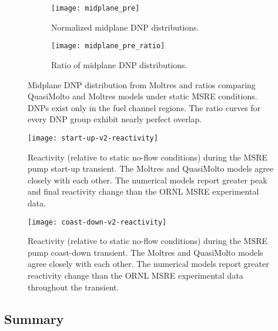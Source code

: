 \begin{figure}[htb]
  \centering
  \begin{subfigure}[b]{0.48\columnwidth}
    \centering
    \texttt{[image: midplane\_pre]}
    \caption{Normalized midplane \gls{DNP} distributions.}
    \label{fig:midplane-pre-dist}
  \end{subfigure}
  \hfill
  \begin{subfigure}[b]{0.48\columnwidth}
    \centering
    \texttt{[image: midplane\_pre\_ratio]}
    \caption{Ratio of midplane \gls{DNP} distributions.}
    \label{fig:midplane-pre-ratio}
  \end{subfigure}
  \caption{Midplane \gls{DNP} distribution from Moltres and ratios comparing QuasiMolto and Moltres
  models under static \gls{MSRE} conditions. \glspl{DNP} exist only in the fuel channel regions.
  The ratio curves for every \gls{DNP} group exhibit nearly perfect overlap.}
  \label{fig:midplane-pre}
\end{figure}

\begin{figure}[htb]
  \centering
  \texttt{[image: start-up-v2-reactivity]}
  \caption{Reactivity (relative to static no-flow conditions) during the \gls{MSRE} pump start-up
  transient. The Moltres and QuasiMolto models agree closely with each other. The numerical models
  report greater peak and final reactivity change than the \gls{ORNL} \gls{MSRE} experimental
  data.}
  \label{fig:start-up-reactivity}
\end{figure}

\begin{figure}[htb]
  \centering
  \texttt{[image: coast-down-v2-reactivity]}
  \caption{Reactivity (relative to static no-flow conditions) during the \gls{MSRE} pump coast-down
  transient. The Moltres and QuasiMolto models agree closely with each other. The numerical models
  report greater reactivity change than the \gls{ORNL} \gls{MSRE} experimental data throughout the
  transient.}
  \label{fig:coast-down-reactivity}
\end{figure}

\subsection{Summary}

\FloatBarrier
